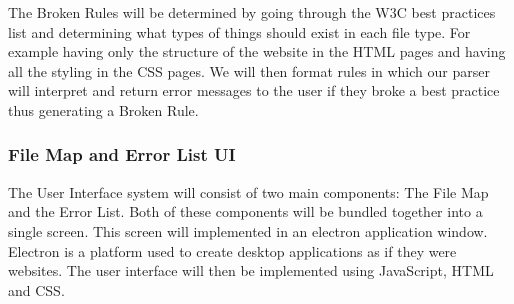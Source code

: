 \documentclass[letterpaper,10pt,titlepage,draftclsnofoot,onecolumn,onesided] {IEEEtran}
\begin{document}
The Broken Rules will be determined by going through the W3C best practices list and determining what types of things should exist in each file type. 
For example having only the structure of the website in the HTML pages and having all the styling in the CSS pages. 
We will then format rules in which our parser will interpret and return error messages to the user if they broke a best practice thus generating a Broken Rule.\cite{w3c}
	
\subsubsection{File Map and Error List UI}
The User Interface system will consist of two main components: The File Map and the Error List. 
Both of these components will be bundled together into a single screen. 
This screen will implemented in an electron application window. 
Electron is a platform used to create desktop applications as if they were websites. \cite{Electron}
The user interface will then be implemented using JavaScript, HTML and CSS.
\end{document}
